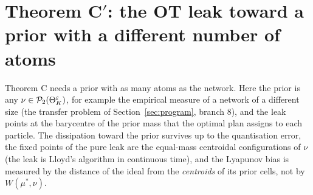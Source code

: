 \section{Theorem C$'$: the OT leak toward a prior with a different number of atoms}\label{sec:thmCprime}

Theorem C needs a prior with as many atoms as the network. Here the prior is any $\nu\in\mathcal{P}_2(\Theta_K^{\varepsilon})$, for example
the empirical measure of a network of a different size (the transfer problem of Section~\ref{sec:program}, branch 8),
and the leak points at the barycentre of the prior mass that the optimal plan assigns to each particle. The
dissipation toward the prior survives up to the quantisation error, the fixed points of the pure leak are the
equal-mass centroidal configurations of $\nu$ (the leak is Lloyd's algorithm in continuous time), and the Lyapunov
bias is measured by the distance of the ideal from the \emph{centroids} of its prior cells, not by $W(\mu^*,\nu)$.

